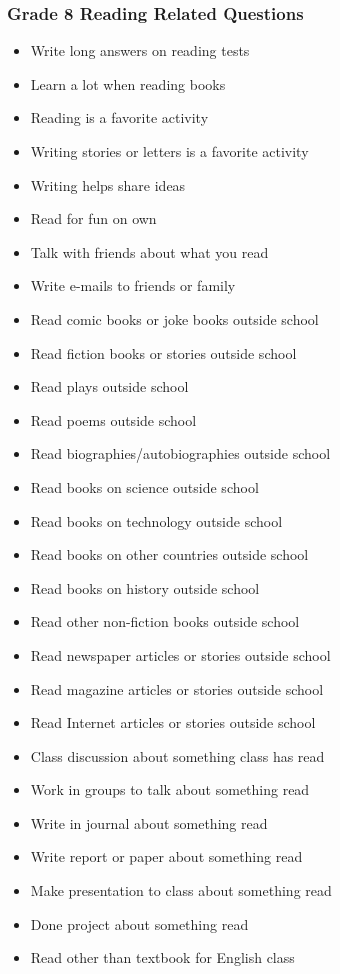 \documentclass[letterpaper,12p,twoside]{article} %
\begin{document}
\begin{singlespace}
\subsubsection{Grade 8 Reading Related Questions}
\begin{itemize}
	\item Write long answers on reading tests
	\item Learn a lot when reading books
	\item Reading is a favorite activity
	\item Writing stories or letters is a favorite activity
	\item Writing helps share ideas
	\item Read for fun on own
	\item Talk with friends about what you read
	\item Write e-mails to friends or family
	\item Read comic books or joke books outside school
	\item Read fiction books or stories outside school
	\item Read plays outside school
	\item Read poems outside school
	\item Read biographies/autobiographies outside school
	\item Read books on science outside school
	\item Read books on technology outside school
	\item Read books on other countries outside school
	\item Read books on history outside school
	\item Read other non-fiction books outside school
	\item Read newspaper articles or stories outside school
	\item Read magazine articles or stories outside school
	\item Read Internet articles or stories outside school
	\item Class discussion about something class has read
	\item Work in groups to talk about something read
	\item Write in journal about something read
	\item Write report or paper about something read
	\item Make presentation to class about something read
	\item Done project about something read
	\item Read other than textbook for English class

\end{itemize}
\end{singlespace}
\end{document}
